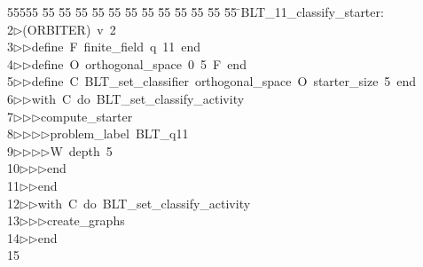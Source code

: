 %
%
\begin{tabbing}
55555 \= 55 \= 55 \= 55 \= 55 \= 55 \= 55 \= 55 \= 55 \= 55 \= 55 \= 55 \= 55 \= \>BLT\_11\_classify\_starter:\\[0pt]
2\>$\triangleright$\>(ORBITER)\ v\ 2\ \\[0pt]
3\>$\triangleright$\>$\triangleright$\>define\ F\ finite\_field\ q\ 11\ end\ \\[0pt]
4\>$\triangleright$\>$\triangleright$\>define\ O\ orthogonal\_space\ 0\ 5\ F\ end\ \\[0pt]
5\>$\triangleright$\>$\triangleright$\>define\ C\ BLT\_set\_classifier\ orthogonal\_space\ O\ starter\_size\ 5\ end\ \\[0pt]
6\>$\triangleright$\>$\triangleright$\>with\ C\ do\ BLT\_set\_classify\_activity\ \\[0pt]
7\>$\triangleright$\>$\triangleright$\>$\triangleright$\>compute\_starter\ \\[0pt]
8\>$\triangleright$\>$\triangleright$\>$\triangleright$\>$\triangleright$\>problem\_label\ BLT\_q11\ \\[0pt]
9\>$\triangleright$\>$\triangleright$\>$\triangleright$\>$\triangleright$\>W\ depth\ 5\ \\[0pt]
10\>$\triangleright$\>$\triangleright$\>$\triangleright$\>end\ \\[0pt]
11\>$\triangleright$\>$\triangleright$\>end\ \\[0pt]
12\>$\triangleright$\>$\triangleright$\>with\ C\ do\ BLT\_set\_classify\_activity\ \\[0pt]
13\>$\triangleright$\>$\triangleright$\>$\triangleright$\>create\_graphs\ \\[0pt]
14\>$\triangleright$\>$\triangleright$\>end\\[0pt]
15\>\end{tabbing}
